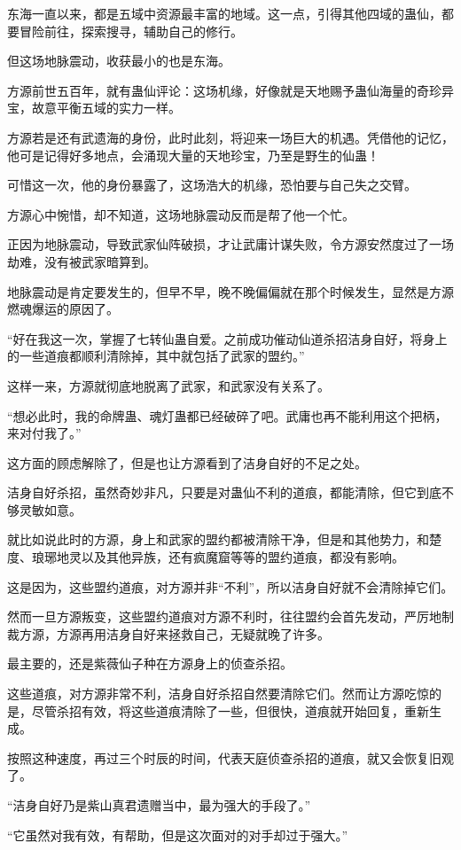 \begin{this_body}
东海一直以来，都是五域中资源最丰富的地域。这一点，引得其他四域的蛊仙，都要冒险前往，探索搜寻，辅助自己的修行。

但这场地脉震动，收获最小的也是东海。

方源前世五百年，就有蛊仙评论：这场机缘，好像就是天地赐予蛊仙海量的奇珍异宝，故意平衡五域的实力一样。

方源若是还有武遗海的身份，此时此刻，将迎来一场巨大的机遇。凭借他的记忆，他可是记得好多地点，会涌现大量的天地珍宝，乃至是野生的仙蛊！

可惜这一次，他的身份暴露了，这场浩大的机缘，恐怕要与自己失之交臂。

方源心中惋惜，却不知道，这场地脉震动反而是帮了他一个忙。

正因为地脉震动，导致武家仙阵破损，才让武庸计谋失败，令方源安然度过了一场劫难，没有被武家暗算到。

地脉震动是肯定要发生的，但早不早，晚不晚偏偏就在那个时候发生，显然是方源燃魂爆运的原因了。

“好在我这一次，掌握了七转仙蛊自爱。之前成功催动仙道杀招洁身自好，将身上的一些道痕都顺利清除掉，其中就包括了武家的盟约。”

这样一来，方源就彻底地脱离了武家，和武家没有关系了。

“想必此时，我的命牌蛊、魂灯蛊都已经破碎了吧。武庸也再不能利用这个把柄，来对付我了。”

这方面的顾虑解除了，但是也让方源看到了洁身自好的不足之处。

洁身自好杀招，虽然奇妙非凡，只要是对蛊仙不利的道痕，都能清除，但它到底不够灵敏如意。

就比如说此时的方源，身上和武家的盟约都被清除干净，但是和其他势力，和楚度、琅琊地灵以及其他异族，还有疯魔窟等等的盟约道痕，都没有影响。

这是因为，这些盟约道痕，对方源并非“不利”，所以洁身自好就不会清除掉它们。

然而一旦方源叛变，这些盟约道痕对方源不利时，往往盟约会首先发动，严厉地制裁方源，方源再用洁身自好来拯救自己，无疑就晚了许多。

最主要的，还是紫薇仙子种在方源身上的侦查杀招。

这些道痕，对方源非常不利，洁身自好杀招自然要清除它们。然而让方源吃惊的是，尽管杀招有效，将这些道痕清除了一些，但很快，道痕就开始回复，重新生成。

按照这种速度，再过三个时辰的时间，代表天庭侦查杀招的道痕，就又会恢复旧观了。

“洁身自好乃是紫山真君遗赠当中，最为强大的手段了。”

“它虽然对我有效，有帮助，但是这次面对的对手却过于强大。”


\end{this_body}
